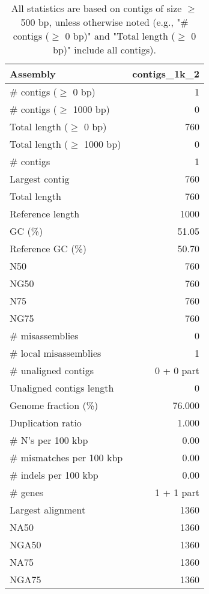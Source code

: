 \documentclass[12pt,a4paper]{article}
\begin{document}
\begin{table}[ht]
\begin{center}
\caption{All statistics are based on contigs of size $\geq$ 500 bp, unless otherwise noted (e.g., "\# contigs ($\geq$ 0 bp)" and "Total length ($\geq$ 0 bp)" include all contigs).}
\begin{tabular}{|l*{1}{|r}|}
\hline
Assembly & contigs\_1k\_2 \\ \hline
\# contigs ($\geq$ 0 bp) & 1 \\ \hline
\# contigs ($\geq$ 1000 bp) & 0 \\ \hline
Total length ($\geq$ 0 bp) & 760 \\ \hline
Total length ($\geq$ 1000 bp) & 0 \\ \hline
\# contigs & 1 \\ \hline
Largest contig & 760 \\ \hline
Total length & 760 \\ \hline
Reference length & 1000 \\ \hline
GC (\%) & 51.05 \\ \hline
Reference GC (\%) & 50.70 \\ \hline
N50 & 760 \\ \hline
NG50 & 760 \\ \hline
N75 & 760 \\ \hline
NG75 & 760 \\ \hline
\# misassemblies & 0 \\ \hline
\# local misassemblies & 1 \\ \hline
\# unaligned contigs & 0 + 0 part \\ \hline
Unaligned contigs length & 0 \\ \hline
Genome fraction (\%) & 76.000 \\ \hline
Duplication ratio & 1.000 \\ \hline
\# N's per 100 kbp & 0.00 \\ \hline
\# mismatches per 100 kbp & 0.00 \\ \hline
\# indels per 100 kbp & 0.00 \\ \hline
\# genes & 1 + 1 part \\ \hline
Largest alignment & 1360 \\ \hline
NA50 & 1360 \\ \hline
NGA50 & 1360 \\ \hline
NA75 & 1360 \\ \hline
NGA75 & 1360 \\ \hline
\end{tabular}
\end{center}
\end{table}
\end{document}
